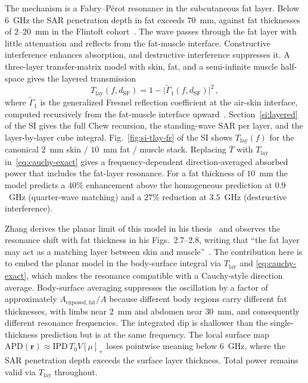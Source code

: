 \documentclass[journal,twocolumn,10pt]{IEEEtran}
\theoremstyle{plain}
\newcommand{\rr}{\mathbf{r}}
\newcommand{\IPD}{\mathrm{IPD}}
\newcommand{\APD}{\mathrm{APD}}
\newcommand{\Tbar}{\bar{T}}
\newcommand{\Tlay}{T_{\mathrm{lay}}}
\newcommand{\pospart}[1]{\left[#1\right]_{+}}
\newcommand{\Vis}{V}
\begin{document}
The mechanism is a Fabry--P\'erot resonance in the subcutaneous fat
layer. Below $6$~GHz the SAR penetration depth in fat exceeds
$70$~mm, against fat thicknesses of $2$--$20$~mm in the Flintoft
cohort~\cite[Table~1]{Flintoft2014}. The wave passes through the fat
layer with little attenuation and reflects from the fat-muscle
interface. Constructive interference enhances absorption, and destructive
interference suppresses it. A three-layer transfer-matrix model with
skin, fat, and a semi-infinite muscle half-space gives the layered
transmission
\begin{equation}\label{eq:T-lay}
  \Tlay(f, d_{\mathrm{SF}})
  = 1 - \bigl|\widetilde{\Gamma}_1(f, d_{\mathrm{SF}})\bigr|^2\, ,
\end{equation}
where $\widetilde{\Gamma}_1$ is the generalized Fresnel reflection
coefficient at the air-skin interface, computed recursively from the
fat-muscle interface upward~\cite{Chew1995,BornWolf1999}.
Section~\ref{si:layered} of the SI gives the full Chew recursion,
the standing-wave SAR per layer, and the layer-by-layer cube
integral. Fig.~\ref{fig:si-tlay-fr} of the SI shows $\Tlay(f)$ for
the canonical $2$~mm skin / $10$~mm fat / muscle stack. Replacing
$\Tbar$ with $\Tlay$ in~\eqref{eq:cauchy-exact} gives a
frequency-dependent direction-averaged absorbed power that includes
the fat-layer resonance. For a fat thickness of $10$~mm the model
predicts a $40\%$ enhancement above the homogeneous prediction at
$0.9$~GHz (quarter-wave matching) and a $27\%$ reduction at
$3.5$~GHz (destructive interference).

Zhang derives the planar limit of this model in his
thesis~\cite[Sec.~2.2]{Zhang2017thesis} and observes the resonance
shift with fat thickness in his Figs.~2.7--2.8, writing that ``the
fat layer may act as a matching layer between skin and
muscle''~\cite[p.~21]{Zhang2017thesis}. The contribution here is to
embed the planar model in the body-surface integral via $\Tlay$ and
\eqref{eq:cauchy-exact}, which makes the resonance compatible with a
Cauchy-style direction average. Body-surface averaging suppresses
the oscillation by a factor of approximately
$A_{\mathrm{exposed,fat}}/A$ because different body regions carry
different fat thicknesses, with limbs near $2$~mm and abdomen near
$30$~mm, and consequently different resonance frequencies. The
integrated dip is shallower than the single-thickness prediction but
is at the same frequency. The local surface map
$\APD(\rr) \approx \IPD\,T_0 \Vis \pospart{\mu}$ loses pointwise
meaning below $6$~GHz, where the SAR penetration depth exceeds the
surface layer thickness. Total power remains valid via $\Tlay$
throughout.
\end{document}
